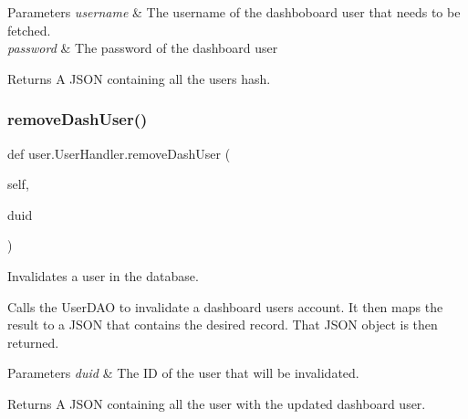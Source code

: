 \begin{DoxyParams}{Parameters}
{\em username} & The username of the dashboboard user that needs to be fetched. \\
\hline
{\em password} & The password of the dashboard user \\
\hline
\end{DoxyParams}
\begin{DoxyReturn}{Returns}
A J\+S\+ON containing all the user\textquotesingle{}s hash. 
\end{DoxyReturn}
\mbox{\label{classuser_1_1_user_handler_a9d7c736b2c572f595a2c32fb78d77590}} 
\subsubsection{\texorpdfstring{remove\+Dash\+User()}{removeDashUser()}}
{\footnotesize\ttfamily def user.\+User\+Handler.\+remove\+Dash\+User (\begin{DoxyParamCaption}\item[{}]{self,  }\item[{}]{duid }\end{DoxyParamCaption})}



Invalidates a user in the database. 

Calls the User\+D\+AO to invalidate a dashboard user\textquotesingle{}s account. It then maps the result to a J\+S\+ON that contains the desired record. That J\+S\+ON object is then returned.


\begin{DoxyParams}{Parameters}
{\em duid} & The ID of the user that will be invalidated.\\
\hline
\end{DoxyParams}
\begin{DoxyReturn}{Returns}
A J\+S\+ON containing all the user with the updated dashboard user. 
\end{DoxyReturn}
\mbox{\label{classuser_1_1_user_handler_a8560cf2f90768ffc9f1986518f50e675}} 
